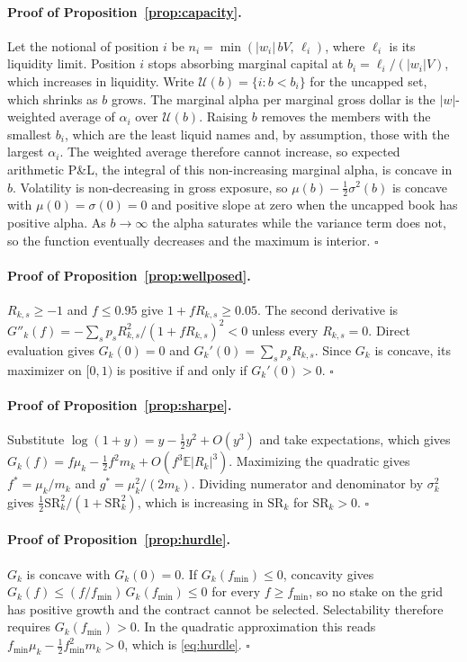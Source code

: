 \documentclass[11pt]{article}
\theoremstyle{definition}
\newcommand{\E}{\mathbb{E}}
\newcommand{\1}{\mathbf{1}}
\begin{document}
\paragraph{Proof of Proposition~\ref{prop:capacity}.}
Let the notional of position $i$ be $n_i=\min(|w_i|\,bV,\,\ell_i)$, where $\ell_i$ is its
liquidity limit. Position $i$ stops absorbing marginal capital at $b_i=\ell_i/(|w_i|V)$,
which increases in liquidity. Write $\mathcal U(b)=\{i:b<b_i\}$ for the uncapped set, which
shrinks as $b$ grows. The marginal alpha per marginal gross dollar is the $|w|$-weighted
average of $\alpha_i$ over $\mathcal U(b)$. Raising $b$ removes the members with the smallest
$b_i$, which are the least liquid names and, by assumption, those with the largest $\alpha_i$.
The weighted average therefore cannot increase, so expected arithmetic P\&L, the integral of
this non-increasing marginal alpha, is concave in $b$. Volatility is non-decreasing in
gross exposure, so $\mu(b)-\tfrac12\sigma^2(b)$ is concave with $\mu(0)=\sigma(0)=0$ and
positive slope at zero when the uncapped book has positive alpha. As $b\to\infty$ the alpha
saturates while the variance term does not, so the function eventually decreases and the
maximum is interior. $\square$

\paragraph{Proof of Proposition~\ref{prop:wellposed}.}
$R_{k,s}\ge-1$ and $f\le0.95$ give $1+fR_{k,s}\ge0.05$. The second derivative is
$G''_k(f)=-\sum_sp_sR_{k,s}^2/(1+fR_{k,s})^2<0$ unless every $R_{k,s}=0$. Direct evaluation
gives $G_k(0)=0$ and $G_k'(0)=\sum_sp_sR_{k,s}$. Since $G_k$ is concave, its maximizer on
$[0,1)$ is positive if and only if $G_k'(0)>0$. $\square$

\paragraph{Proof of Proposition~\ref{prop:sharpe}.}
Substitute $\log(1+y)=y-\tfrac12y^2+O(y^3)$ and take expectations, which gives
$G_k(f)=f\mu_k-\tfrac12f^2m_k+O(f^3\E|R_k|^3)$. Maximizing the quadratic gives
$f^\ast=\mu_k/m_k$ and $g^\ast=\mu_k^2/(2m_k)$. Dividing numerator and denominator by
$\sigma_k^2$ gives $\tfrac12\mathrm{SR}_k^2/(1+\mathrm{SR}_k^2)$, which is increasing in
$\mathrm{SR}_k$ for $\mathrm{SR}_k>0$. $\square$

\paragraph{Proof of Proposition~\ref{prop:hurdle}.}
$G_k$ is concave with $G_k(0)=0$. If $G_k(f_{\min})\le0$, concavity gives
$G_k(f)\le(f/f_{\min})\,G_k(f_{\min})\le0$ for every $f\ge f_{\min}$, so no stake on the grid has
positive growth and the contract cannot be selected. Selectability therefore requires
$G_k(f_{\min})>0$. In the quadratic approximation this reads
$f_{\min}\mu_k-\tfrac12f_{\min}^2m_k>0$, which is \eqref{eq:hurdle}. $\square$
\end{document}
